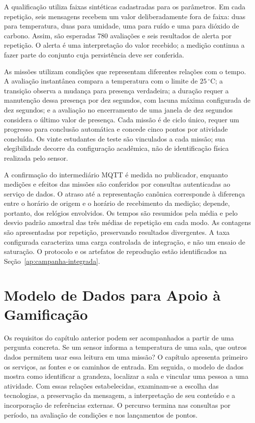 \documentclass[tcc,capa]{texufpel}
\newif\ifemrevisao
\newcommand{\tintarevisao}{\ifemrevisao\color{correvisao}\fi}
\DeclareRobustCommand{\rev}[1]{{\tintarevisao #1}}
\newcommand{\AP}{\todo[inline, color=yellow!40]}
\begin{document}
\AP{não seria o caso de incluir footnote para essa api?}

A qualificação utiliza faixas sintéticas cadastradas para os parâmetros. Em cada repetição, seis mensagens recebem um valor deliberadamente fora de faixa: duas para temperatura, duas para umidade, uma para ruído e uma para dióxido de carbono. Assim, são esperadas 780 avaliações e seis resultados de alerta por repetição. O alerta é uma interpretação do valor recebido; a medição continua a fazer parte do conjunto cuja persistência deve ser conferida.

As missões utilizam condições que representam diferentes relações com o tempo. A avaliação instantânea compara a temperatura com o limite de $25\,^{\circ}\mathrm{C}$; a transição observa a mudança para presença verdadeira; a duração requer a manutenção dessa presença por dez segundos, com lacuna máxima configurada de dez segundos; e a avaliação no encerramento de uma janela de dez segundos considera o último valor de presença. Cada missão é de ciclo único, requer um progresso para conclusão automática e concede cinco pontos por atividade concluída. Os vinte estudantes de teste são vinculados a cada missão; sua elegibilidade decorre da configuração acadêmica, não de identificação física realizada pelo sensor.

A confirmação do intermediário MQTT é medida no publicador, enquanto medições e efeitos das missões são conferidos por consultas autenticadas ao serviço de dados. O atraso até a representação canônica corresponde à diferença entre o horário de origem e o horário de recebimento da medição; depende, portanto, dos relógios envolvidos. Os tempos são resumidos pela média e pelo desvio padrão amostral das três médias de repetição em cada modo. As contagens são apresentadas por repetição, preservando resultados divergentes. A taxa configurada caracteriza uma carga controlada de integração, e não um ensaio de saturação. O protocolo e os artefatos de reprodução estão identificados na Seção~\ref{ap:campanha-integrada}.

\chapter{\rev{Modelo de Dados para Apoio à Gamificação}}\label{cap:desenvolvimento}

\rev{Os requisitos do capítulo anterior podem ser acompanhados a partir de uma pergunta concreta. Se um sensor informa a temperatura de uma sala, que outros dados permitem usar essa leitura em uma missão? O capítulo apresenta primeiro os serviços, as fontes e os caminhos de entrada. Em seguida, o modelo de dados mostra como identificar a grandeza, localizar a sala e vincular uma pessoa a uma atividade. Com essas relações estabelecidas, examinam-se a escolha das tecnologias, a preservação da mensagem, a interpretação de seu conteúdo e a incorporação de referências externas. O percurso termina nas consultas por período, na avaliação de condições e nos lançamentos de pontos.}
\end{document}
